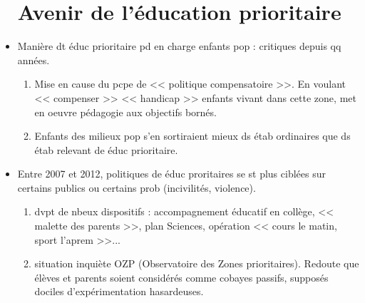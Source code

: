 \documentclass[12pt]{report}
\begin{document}
\begin{itemize}
\section{Avenir de l'éducation prioritaire}

\item Manière dt éduc prioritaire pd en charge enfants pop : critiques depuis qq années.
\begin{enumerate}
\item Mise en cause du pcpe de << politique compensatoire >>. En voulant << compenser >> << handicap >> enfants vivant dans cette zone, met en oeuvre pédagogie aux objectifs bornés.\\
\item Enfants des milieux pop s'en sortiraient mieux ds étab ordinaires que ds étab relevant de éduc prioritaire. \\
\end{enumerate}


\vspace{0.5cm}

\item  Entre 2007 et 2012, politiques de éduc proritaires se st plus ciblées sur certains publics ou certains prob (incivilités, violence).
\begin{enumerate}
\item dvpt de nbeux dispositifs : accompagnement éducatif en collège, << malette des parents >>, plan Sciences, opération << cours le matin, sport l'aprem >>... \\
\item situation inquiète OZP (Observatoire des Zones prioritaires). Redoute que élèves et parents soient considérés comme cobayes passifs, supposés dociles d'expérimentation hasardeuses. \\


\end{enumerate}
\end{itemize}
\end{document}

